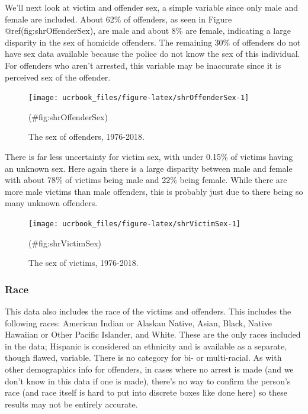 \documentclass[
  12pt,
  openany]{book}
\begin{document}
We'll next look at victim and offender sex, a simple variable since only male and female are included. About 62\% of offenders, as seen in Figure @ref(fig:shrOffenderSex), are male and about 8\% are female, indicating a large disparity in the sex of homicide offenders. The remaining 30\% of offenders do not have sex data available because the police do not know the sex of this individual. For offenders who aren't arrested, this variable may be inaccurate since it is perceived sex of the offender.

\begin{figure}

{\centering \texttt{[image: ucrbook\_files/figure-latex/shrOffenderSex-1]} 

}

\caption{The sex of offenders, 1976-2018.}(\#fig:shrOffenderSex)
\end{figure}

There is far less uncertainty for victim sex, with under 0.15\% of victims having an unknown sex. Here again there is a large disparity between male and female with about 78\% of victims being male and 22\% being female. While there are more male victims than male offenders, this is probably just due to there being so many unknown offenders.

\begin{figure}

{\centering \texttt{[image: ucrbook\_files/figure-latex/shrVictimSex-1]} 

}

\caption{The sex of victims, 1976-2018.}(\#fig:shrVictimSex)
\end{figure}

\hypertarget{race-1}{%
\subsubsection{Race}\label{race-1}}

This data also includes the race of the victims and offenders. This includes the following races: American Indian or Alaskan Native, Asian, Black, Native Hawaiian or Other Pacific Islander, and White. These are the only races included in the data; Hispanic is considered an ethnicity and is available as a separate, though flawed, variable. There is no category for bi- or multi-racial. As with other demographics info for offenders, in cases where no arrest is made (and we don't know in this data if one is made), there's no way to confirm the person's race (and race itself is hard to put into discrete boxes like done here) so these results may not be entirely accurate.
\end{document}

